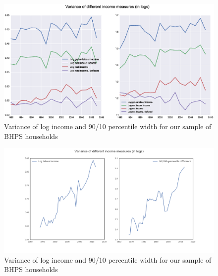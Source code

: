 \begin{figure}
\includegraphics[width=\columnwidth]{BHPS_incvar}
\caption{Variance of log income and 90/10 percentile width for our sample of
BHPS households}
\label{fig:bhps_incvar}
\end{figure}

\begin{figure}
\includegraphics[width=\columnwidth]{PSID_incvar}
\caption{Variance of log income and 90/10 percentile width for our sample of
BHPS households}
\label{fig:bhps_incvar}
\end{figure}
 

